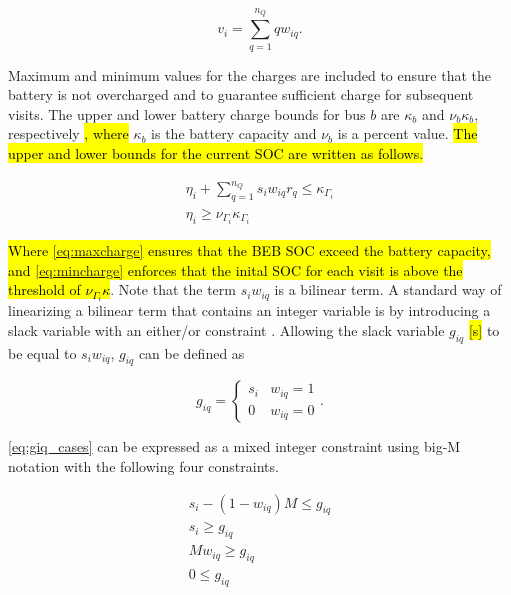\documentclass[utf8]{FrontiersinHarvard}
\let\cite\citep                                       %
\begin{document}
\begin{equation}
    v_i = \sum_{q=1}^{n_Q} qw_{iq}.
\end{equation}

Maximum and minimum values for the charges are included to ensure that the battery is not overcharged and to guarantee
sufficient charge for subsequent visits. The upper and lower battery charge bounds for bus \(b\) are \(\kappa_b\) and \(\nu_b \kappa_b\),
respectively \hl{, where} \(\kappa_b\) is the battery capacity and \(\nu_b\) is a percent value. \hl{The upper and lower bounds for the current SOC are written as follows.}

\begin{subequations}
    \label{subeq:pre_min_max}
\begin{align}
    \eta_i + \sum_{q=1}^{n_Q} s_i w_{iq} r_q \leq \kappa_{\Gamma_i} \label{eq:maxcharge}\\
    \eta_i \geq \nu_{\Gamma_i} \kappa_{\Gamma_i} \label{eq:mincharge}
\end{align}
\end{subequations}

\hl{Where {\autoref{eq:maxcharge}} ensures that the BEB SOC exceed the battery capacity, and {\autoref{eq:mincharge}} enforces that the inital SOC for each visit is above the threshold of $\nu_{\Gamma_i}\kappa$}. Note that
the term \(s_i w_{iq}\) is a bilinear term. A standard way of linearizing a bilinear term that contains an integer
variable is by introducing a slack variable with an either/or constraint
\cite{chen-2010-applied,rodriguez-2013-compar-asses}. Allowing the slack variable \(g_{iq}\) \hl{[s]} to be
equal to \(s_i w_{iq}\), \(g_{iq}\) can be defined as

\begin{equation}
    \label{eq:giq_cases}
    g_{iq} =
    \begin{cases}
        s_i & w_{iq} = 1 \\
        0 & w_{iq} = 0
    \end{cases}.
\end{equation}

\autoref{eq:giq_cases} can be expressed as a mixed integer constraint using big-M notation with the following four
constraints.

\begin{subequations}
    \label{eq:slack_gain}
\begin{align}
    s_i - (1 - w_{iq})M \leq g_{iq}  \label{subeq:repgpgret} \\
    s_i \geq g_{iq}                 \label{subeq:repgples} \\
    Mw_{iq} \geq g_{iq}              \label{subeq:repgwgret} \\
    0 \leq g_{iq}                   \label{subeq:repgwles}
\end{align}
\end{subequations}
\end{document}
